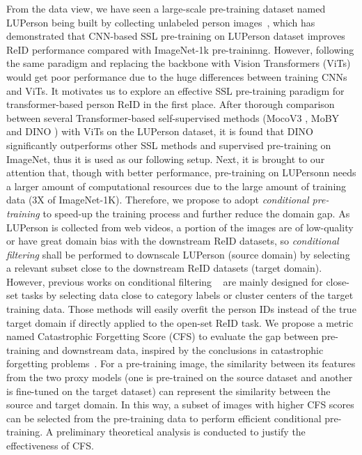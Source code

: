 \documentclass[10pt,twocolumn,letterpaper]{article}
\begin{document}
From the data view, we have seen a large-scale pre-training dataset named LUPerson being built by collecting unlabeled person images~\cite{fu2021unsupervised}, which has demonstrated that CNN-based SSL pre-training on LUPerson dataset improves ReID performance compared with ImageNet-1k pre-traininng. However, following the same paradigm and replacing the backbone with Vision Transformers (ViTs)~\cite{VIT} would get poor performance due to the huge differences between training CNNs and ViTs. It motivates us to explore an effective SSL pre-training paradigm for transformer-based person ReID in the first place. After thorough comparison between several Transformer-based self-supervised methods (\eg MocoV3 \cite{chen2021mocov3}, MoBY \cite{moby} and DINO \cite{dino}) with ViTs on the LUPerson dataset, it is found that DINO significantly outperforms other SSL methods and supervised pre-training on ImageNet, thus it is used as our following setup. Next, it is brought to our attention that, though with better performance, pre-training on LUPersonn needs a larger amount of computational resources due to the large amount of training data (3X of ImageNet-1K). Therefore, we propose to adopt \textit{conditional pre-training} to speed-up the training process and further reduce the domain gap. As LUPerson is collected from web videos, a portion of the images are of low-quality or have great domain bias with the downstream ReID datasets, so \textit{conditional filtering} shall be performed to downscale LUPerson (source domain) by selecting a relevant subset close to the downstream ReID datasets (target domain). However, previous works on conditional filtering ~\cite{chakraborty2020efficient, coleman2020selection, ge2017borrowing, cui2018large, Fine} are mainly designed for close-set tasks by selecting data close to category labels or cluster centers of the target training data. Those methods will easily overfit the person IDs instead of the true target domain if directly applied to the open-set ReID task. We propose a metric named Catastrophic Forgetting Score (CFS) to evaluate the gap between pre-training and downstream data, inspired by the conclusions in catastrophic forgetting problems~\cite{thompson2019overcoming,kirkpatrick2017overcoming,ramasesh2021anatomy}. For a pre-training image, the similarity between its features from the two proxy models (one is pre-trained on the source dataset and another is fine-tuned on the target dataset) can represent the similarity between the source and target domain. In this way, a subset of images with higher CFS scores can be selected from the pre-training data to perform efficient conditional pre-training. A preliminary theoretical analysis is conducted to justify the effectiveness of CFS.
\end{document}
